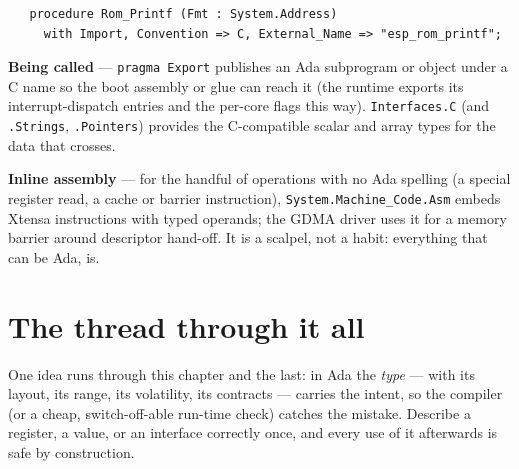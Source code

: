 \begin{lstlisting}
   procedure Rom_Printf (Fmt : System.Address)
     with Import, Convention => C, External_Name => "esp_rom_printf";
\end{lstlisting}

\textbf{Being called} --- \texttt{pragma Export} publishes an Ada subprogram or
object under a C name so the boot assembly or glue can reach it (the runtime
exports its interrupt-dispatch entries and the per-core flags this way).
\texttt{Interfaces.C} (and \texttt{.Strings}, \texttt{.Pointers}) provides the
C-compatible scalar and array types for the data that crosses.

\textbf{Inline assembly} --- for the handful of operations with no Ada spelling
(a special register read, a cache or barrier instruction),
\texttt{System.Machine\_Code.Asm} embeds Xtensa instructions with typed operands;
the GDMA driver uses it for a memory barrier around descriptor hand-off. It is a
scalpel, not a habit: everything that can be Ada, is.

\section{The thread through it all}

One idea runs through this chapter and the last: in Ada the \emph{type} --- with
its layout, its range, its volatility, its contracts --- carries the intent, so the
compiler (or a cheap, switch-off-able run-time check) catches the mistake. Describe
a register, a value, or an interface correctly once, and every use of it afterwards
is safe by construction.
